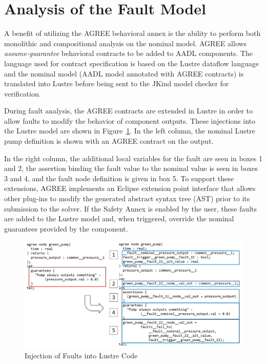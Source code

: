 \section{Analysis of the Fault Model}
\label{sec:fault_analysis}

A  benefit of utilizing the AGREE behavioral annex is the ability to perform both monolithic and compositional analysis on the nominal model. AGREE allows {\em assume-guarantee} behavioral contracts to be added to AADL components.  The language used for contract specification is based on the Lustre dataflow language~\cite{Halbwachs91:IEEE} and the nominal model (AADL model annotated with AGREE contracts) is translated into Lustre before being sent to the JKind model checker for verification\cite{2017arXiv171201222G}. 

During fault analysis, the AGREE contracts are extended in Lustre in order to allow faults to modify the behavior of component outputs. These injections into the Lustre model are shown in Figure~\ref{fig:lustre}. In the left column, the nominal Lustre pump definition is shown with an AGREE contract on the output. 

In the right column, the additional local variables for the fault are seen in boxes 1 and 2, the assertion binding the fault value to the nominal value is seen in boxes 3 and 4, and the fault node definition is given in box 5. To support these extensions, AGREE implements an Eclipse extension point interface that allows other plug-ins to modify the generated abstract syntax tree (AST) prior to its submission to the solver.  If the Safety Annex is enabled by the user, these faults are added to the Lustre model and, when triggered, override the nominal guarantees provided by the component.

\begin{figure}[h!]
	\hspace*{-2cm}
	\vspace{-0.3in} 
	\begin{center}
		\includegraphics[scale=0.3]{images/lustre.jpg}
		\caption{Injection of Faults into Lustre Code}
		\label{fig:lustre}
	\end{center}
	\vspace{-0.3in}
\end{figure}

